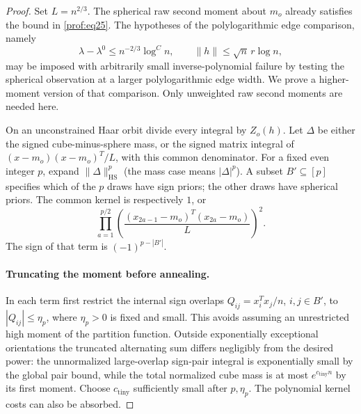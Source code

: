 \begin{proof}
Set \(L=n^{2/3}\).  The spherical raw second moment about \(m_o\)
already satisfies the bound in \eqref{prof:eq25}.  The hypotheses of the
polylogarithmic edge comparison, namely
\[
 \lambda-\lambda^0\le n^{-2/3}\log^C n,
 \qquad \|h\|\le\sqrt n\,r\log n,
\]
may be imposed with arbitrarily small inverse-polynomial failure by
testing the spherical observation at a larger polylogarithmic edge
width.  We prove a higher-moment version of that comparison.  Only
unweighted raw second moments are needed here.

On an unconstrained Haar orbit divide every integral by \(Z_o(h)\).
Let \(\Delta\) be either the signed cube-minus-sphere mass, or the signed
matrix integral of \((x-m_o)(x-m_o)^T/L\), with this common denominator.
For a fixed even integer \(p\), expand \(\|\Delta\|_{\mathrm{HS}}^p\)
(the mass case means \(|\Delta|^p\)).  A subset \(B'\subseteq[p]\)
specifies which of the \(p\) draws have sign priors; the other draws have
spherical priors.  The common kernel is respectively \(1\), or
\[
 \prod_{a=1}^{p/2}
 \left(\frac{(x_{2a-1}-m_o)^T(x_{2a}-m_o)}L\right)^2.
\]
The sign of that term is \((-1)^{p-|B'|}\).

\paragraph{Truncating the moment before annealing.}
In each term first restrict the internal sign overlaps
\(Q_{ij}=x_i^Tx_j/n\), \(i,j\in B'\), to
\(|Q_{ij}|\le\eta_p\), where \(\eta_p>0\) is fixed and small.
This avoids assuming an unrestricted high moment of the partition
function.  Outside exponentially exceptional orientations the truncated
alternating sum differs negligibly from the desired power: the
unnormalized large-overlap sign-pair integral is exponentially small by
the global pair bound, while the total normalized cube mass is at most
\(e^{c_{\mathrm{tiny}}n}\) by its first moment.  Choose
\(c_{\mathrm{tiny}}\) sufficiently small after \(p,\eta_p\).
The polynomial kernel costs can also be absorbed.


\end{proof}
